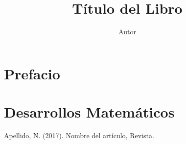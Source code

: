 \documentclass[11pt,a4paper,twoside,openright]{book}
\author{Autor}
\title{Título del Libro}
\begin{document}



\frontmatter


\tableofcontents{}

\chapter{Prefacio}


\mainmatter






\appendix
\chapter{Desarrollos Matemáticos}

\backmatter



\begin{thebibliography}{3}
 Apellido, N. (2017). Nombre del artículo, Revista.
\end{thebibliography}
\end{document}
